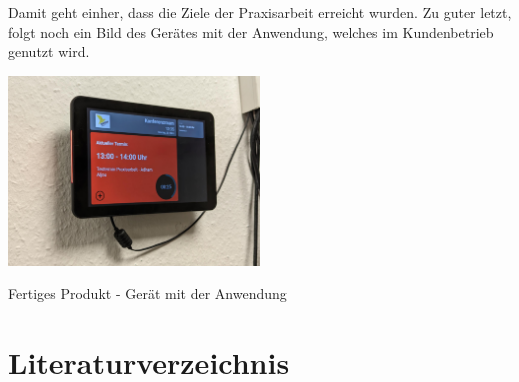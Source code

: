 Damit geht einher, dass die Ziele der Praxisarbeit erreicht wurden.
Zu guter letzt, folgt noch ein Bild des Gerätes mit der Anwendung, welches im Kundenbetrieb genutzt wird.
\newline
\par\vspace{1cm}
    \centering
    \includegraphics[width=0.5\textwidth]{Bilder/FertigesProdukt}
    \caption{Fertiges Produkt - Gerät mit der Anwendung}
    \label{fig:fertiges-produkt}
\newline
\newline
\raggedright
\newpage
\section{Literaturverzeichnis}\label{sec:literaturverzeichnis}